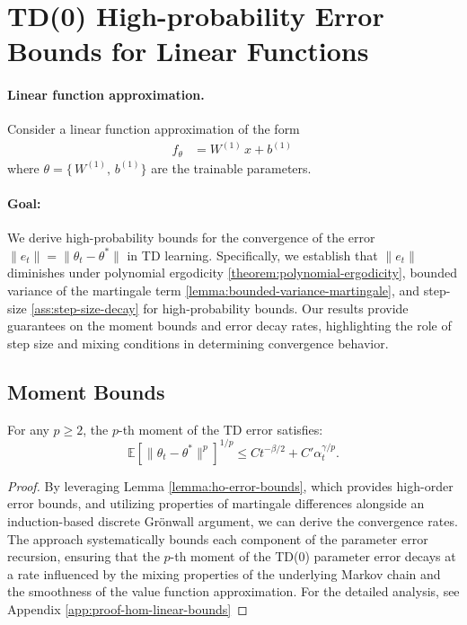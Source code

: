 \section{TD(0) High-probability Error Bounds for Linear Functions}

\paragraph{Linear function approximation.}
Consider a linear function approximation of the form
\begin{align*}
    f_\theta &= W^{(1)}\,x + b^{(1)}\,
\end{align*}
where
\(\theta = \bigl\{\,W^{(1)},\,b^{(1)}\bigr\}\)  
are the trainable parameters. 

\paragraph{Goal:}
We derive high-probability bounds for the convergence of the error \(\|e_t\| = \|\theta_t - \theta^*\|\) in TD learning. Specifically, we establish that \(\|e_t\|\) diminishes under polynomial ergodicity \ref{theorem:polynomial-ergodicity}, bounded variance of the martingale term \ref{lemma:bounded-variance-martingale}, and step-size \ref{ass:step-size-decay} for high-probability bounds.
Our results provide guarantees on the moment bounds and error decay rates, highlighting the role of step size and mixing conditions in determining convergence behavior.

\subsection{Moment Bounds}

\begin{theorem}
\label{theorem:hom-linear-bounds}
For any \(p \geq 2\), the \(p\)-th moment of the TD error satisfies:
\[
\mathbb{E}[\|\theta_t - \theta^*\|^p]^{1/p} \leq C t^{-\beta/2} + C' \alpha_t^{\gamma/p}.
\]
\end{theorem}

\begin{proof}
By leveraging Lemma \ref{lemma:ho-error-bounds}, which provides high-order error bounds, and utilizing properties of martingale differences alongside an induction-based discrete Grönwall argument, we can derive the convergence rates. The approach systematically bounds each component of the parameter error recursion, ensuring that the \( p \)-th moment of the TD(0) parameter error decays at a rate influenced by the mixing properties of the underlying Markov chain and the smoothness of the value function approximation.
For the detailed analysis, see Appendix \ref{app:proof-hom-linear-bounds}
\end{proof}

